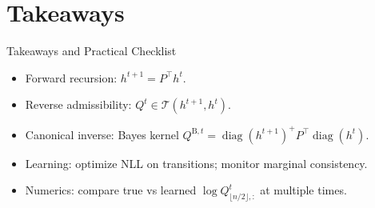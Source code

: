 \documentclass[aspectratio=169,11pt]{beamer}
\newcommand{\diag}{\operatorname{diag}}
\newcommand{\Tset}{\mathcal{T}}
\begin{document}
\section{Takeaways}

\begin{frame}{Takeaways and Practical Checklist}
\begin{itemize}
\item Forward recursion: $h^{t+1}=P^\top h^t$.
\item Reverse admissibility: $Q^t\in\Tset(h^{t+1},h^t)$.
\item Canonical inverse: Bayes kernel $Q^{\mathrm B,t}=\diag(h^{t+1})^+P^\top\diag(h^t)$.
\item Learning: optimize NLL on transitions; monitor marginal consistency.
\item Numerics: compare true vs learned $\log Q^t_{\lfloor n/2\rfloor,:}$ at multiple times.
\end{itemize}
\end{frame}
\end{document}
